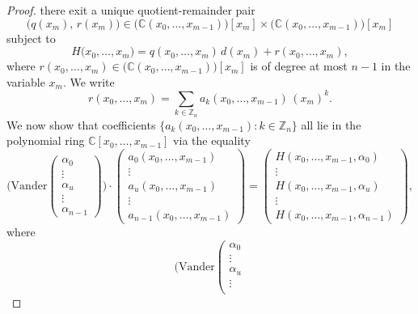 \begin{proof}
there exit a unique quotient-remainder pair
\[
\big(q(x_{m}),\,r(x_{m})\big)\in\big(\mathbb{C}(x_{0},\ldots,x_{m-1})\big)[x_{m}]\times\big(\mathbb{C}(x_{0},\ldots,x_{m-1})\big)[x_{m}]
\]
subject to
\begin{equation}
H\big(x_{0},\ldots,x_{m}\big)=q(x_{0},\ldots,x_{m})\,d(x_{m})+r(x_{0},\ldots,x_{m}),
\end{equation}
where $r\left(x_{0},\ldots,x_{m}\right)\in\big(\mathbb{C}(x_{0},\ldots,x_{m-1})\big)[x_{m}]$
is of degree at most $n-1$ in the variable $x_{m}$. We write 
\begin{equation}
r\left(x_{0},\ldots,x_{m}\right)=\sum_{k\in\mathbb{Z}_{n}}a_{k}\left(x_{0},\ldots,x_{m-1}\right)\,(x_{m})^{k}.
\end{equation}
We now show that coefficients $\big\{ a_k(x_{0},\ldots,x_{m-1}):k\in \mathbb{Z}_n \big\}$ all lie in the polynomial ring $\mathbb{C}[x_{0},\ldots,x_{m-1}]$
via the equality 
\begin{equation}
\bigg(\text{Vander}\left(\begin{array}{c}
\alpha_{0}\\
\vdots\\
\alpha_{u}\\
\vdots\\
\alpha_{n-1}
\end{array}\right)\bigg)\cdot\left(\begin{array}{c}
a_{0}\left(x_{0},\ldots,x_{m-1}\right)\\
\vdots\\
a_{u}\left(x_{0},\ldots,x_{m-1}\right)\\
\vdots\\
a_{n-1}\left(x_{0},\ldots,x_{m-1}\right)
\end{array}\right)=\left(\begin{array}{c}
H(x_{0},\ldots,x_{m-1},\alpha_{0})\\
\vdots\\
H(x_{0},\ldots,x_{m-1},\alpha_{u})\\
\vdots\\
H(x_{0},\ldots,x_{m-1},\alpha_{n-1})
\end{array}\right),
\end{equation}
where 
\begin{equation}
\bigg(\text{Vander}\left(\begin{array}{c}
\alpha_{0}\\
\vdots\\
\alpha_{u}\\
\vdots\\

\end{array}
\end{equation}
\end{proof}
